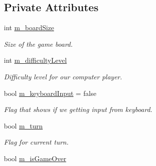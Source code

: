 \subsection*{Private Attributes}
\begin{DoxyCompactItemize}
\item 
int \hyperlink{classMultiplayer__State_abc280a368f8de367bc8caa1f511ec520}{m\+\_\+board\+Size}\hypertarget{classMultiplayer__State_abc280a368f8de367bc8caa1f511ec520}{}\label{classMultiplayer__State_abc280a368f8de367bc8caa1f511ec520}

\begin{DoxyCompactList}\small\item\em Size of the game board. \end{DoxyCompactList}\item 
int \hyperlink{classMultiplayer__State_aed03f15bfad1f0dc57fc30d5bf67db88}{m\+\_\+difficulty\+Level}\hypertarget{classMultiplayer__State_aed03f15bfad1f0dc57fc30d5bf67db88}{}\label{classMultiplayer__State_aed03f15bfad1f0dc57fc30d5bf67db88}

\begin{DoxyCompactList}\small\item\em Difficulty level for our computer player. \end{DoxyCompactList}\item 
bool \hyperlink{classMultiplayer__State_aacb48c484b1e83b78d5d8aaed712246b}{m\+\_\+keyboard\+Input} = false\hypertarget{classMultiplayer__State_aacb48c484b1e83b78d5d8aaed712246b}{}\label{classMultiplayer__State_aacb48c484b1e83b78d5d8aaed712246b}

\begin{DoxyCompactList}\small\item\em Flag that shows if we getting input from keyboard. \end{DoxyCompactList}\item 
bool \hyperlink{classMultiplayer__State_a506fbc150b4706da74424880c9efd6fd}{m\+\_\+turn}\hypertarget{classMultiplayer__State_a506fbc150b4706da74424880c9efd6fd}{}\label{classMultiplayer__State_a506fbc150b4706da74424880c9efd6fd}

\begin{DoxyCompactList}\small\item\em Flag for current turn. \end{DoxyCompactList}\item 
bool \hyperlink{classMultiplayer__State_a0fd9a5903bb71111a30e51019ee7995c}{m\+\_\+is\+Game\+Over}\hypertarget{classMultiplayer__State_a0fd9a5903bb71111a30e51019ee7995c}{}\label{classMultiplayer__State_a0fd9a5903bb71111a30e51019ee7995c}


\end{DoxyCompactItemize}
